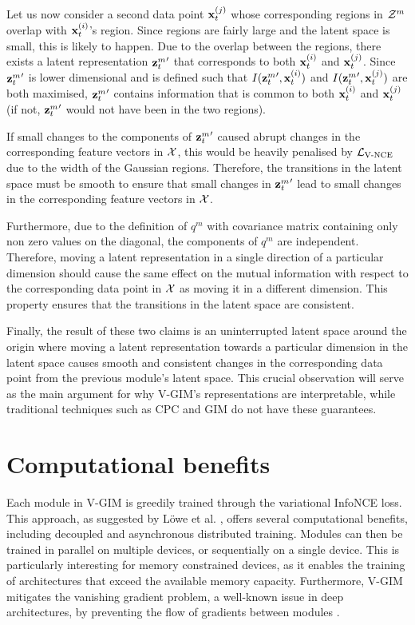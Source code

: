 			Let us now consider a second data point $\mathbf{x}_t^{(j)}$ whose corresponding regions in $\mathcal{Z}^m$ overlap with $\mathbf{x}_t^{(i)}$'s region. Since regions are fairly large and the latent space is small, this is likely to happen. Due to the overlap between the regions, there exists a latent representation ${\mathbf{z}_t^{m}}'$ that corresponds to both $\mathbf{x}_t^{(i)}$ and $\mathbf{x}_t^{(j)}$. 
			Since ${\mathbf{z}_t^{m}}'$ is lower dimensional and is defined such that $I({\mathbf{z}_t^{m}}', \mathbf{x}_t^{(i)})$ and $I({\mathbf{z}_t^{m}}', \mathbf{x}_t^{(j)})$ are both maximised, ${\mathbf{z}_t^{m}}'$ contains information that is common to both $\mathbf{x}_t^{(i)}$ and $\mathbf{x}_t^{(j)}$ (if not, ${\mathbf{z}_t^{m}}'$ would not have been in the two regions).
			
			If small changes to the components of ${\mathbf{z}_t^{m}}'$ caused abrupt changes in the corresponding feature vectors in $\mathcal{X}$, this would be heavily penalised by $\mathcal{L}_{\text{V-NCE}}$ due to the width of the Gaussian regions. Therefore, the transitions in the latent space must be smooth to ensure that small changes in ${\mathbf{z}_t^{m}}'$ lead to small changes in the corresponding feature vectors in $\mathcal{X}$.
			
			Furthermore, due to the definition of $q^m$ with covariance matrix containing only non zero values on the diagonal, the components of $q^m$ are independent. Therefore, moving a latent representation in a single direction of a particular dimension should cause the same effect on the mutual information with respect to the corresponding data point in $\mathcal{X}$ as moving it in a different dimension. This property ensures that the transitions in the latent space are consistent.
							
			Finally, the result of these two claims is an uninterrupted latent space around the origin 
			where moving a latent representation towards a particular dimension in the latent space causes smooth and consistent changes in the corresponding data point from the previous module's latent space. This crucial observation will serve as the main argument for why V-GIM's representations are interpretable, while traditional techniques such as CPC and GIM do not have these guarantees. 
		
		
			


		
\section{Computational benefits} \label{cha:vgim_benefits}
	Each module in V-GIM is greedily trained through the variational InfoNCE loss. This approach, as suggested by Löwe et al. \citep{lowePuttingEndEndtoEnd2020}, offers several computational benefits, including decoupled and asynchronous distributed training. Modules can then be trained in parallel on multiple devices, or sequentially on a single device. This is particularly interesting for memory constrained devices, 
	as it enables the training of architectures that exceed the available memory capacity. Furthermore, V-GIM mitigates the vanishing gradient problem, a well-known issue in deep architectures, by preventing the flow of gradients between modules \citep{huHandlingVanishingGradient2021}.
	
